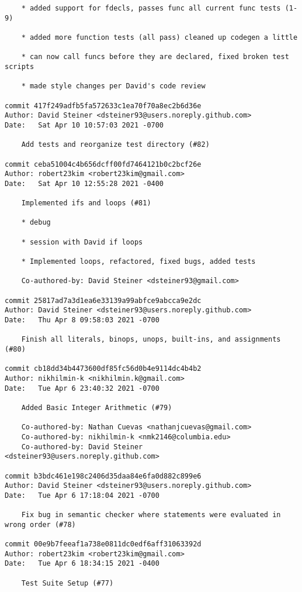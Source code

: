 \documentclass{article}
\begin{document}
\begin{verbatim}
    * added support for fdecls, passes func all current func tests (1-9)
    
    * added more function tests (all pass) cleaned up codegen a little
    
    * can now call funcs before they are declared, fixed broken test scripts
    
    * made style changes per David's code review

commit 417f249adfb5fa572633c1ea70f70a8ec2b6d36e
Author: David Steiner <dsteiner93@users.noreply.github.com>
Date:   Sat Apr 10 10:57:03 2021 -0700

    Add tests and reorganize test directory (#82)

commit ceba51004c4b656dcff00fd7464121b0c2bcf26e
Author: robert23kim <robert23kim@gmail.com>
Date:   Sat Apr 10 12:55:28 2021 -0400

    Implemented ifs and loops (#81)
    
    * debug
    
    * session with David if loops
    
    * Implemented loops, refactored, fixed bugs, added tests
    
    Co-authored-by: David Steiner <dsteiner93@gmail.com>

commit 25817ad7a3d1ea6e33139a99abfce9abcca9e2dc
Author: David Steiner <dsteiner93@users.noreply.github.com>
Date:   Thu Apr 8 09:58:03 2021 -0700

    Finish all literals, binops, unops, built-ins, and assignments (#80)

commit cb18dd34b4473600df85fc56d0b4e9114dc4b4b2
Author: nikhilmin-k <nikhilmin.k@gmail.com>
Date:   Tue Apr 6 23:40:32 2021 -0700

    Added Basic Integer Arithmetic (#79)
    
    Co-authored-by: Nathan Cuevas <nathanjcuevas@gmail.com>
    Co-authored-by: nikhilmin-k <nmk2146@columbia.edu>
    Co-authored-by: David Steiner <dsteiner93@users.noreply.github.com>

commit b3bdc461e198c2406d35daa84e6fa0d882c899e6
Author: David Steiner <dsteiner93@users.noreply.github.com>
Date:   Tue Apr 6 17:18:04 2021 -0700

    Fix bug in semantic checker where statements were evaluated in wrong order (#78)

commit 00e9b7feeaf1a738e0811dc0edf6aff31063392d
Author: robert23kim <robert23kim@gmail.com>
Date:   Tue Apr 6 18:34:15 2021 -0400

    Test Suite Setup (#77)
    

\end{verbatim}
\end{document}
